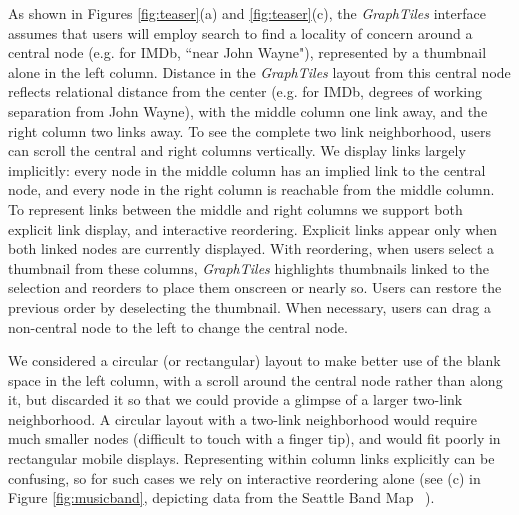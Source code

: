 As shown in Figures \ref{fig:teaser}(a) and \ref{fig:teaser}(c), the \textit{GraphTiles} interface assumes that users will employ search to find a locality of concern around a central node (e.g. for IMDb, ``near John Wayne"), represented by a thumbnail alone in the left column. Distance in the \textit{GraphTiles} layout from this central node reflects relational distance from the center (e.g. for IMDb, degrees of working separation from John Wayne), with the middle column one link away, and the right column two links away. To see the complete two link neighborhood, users can scroll the central and right columns vertically. We display links largely implicitly: every node in the middle column has an implied link to the central node, and every node in the right column is reachable from the middle column. To represent links between the middle and right columns we support both explicit link display, and interactive reordering. Explicit links appear only when both linked nodes are currently displayed. With reordering, when users select a thumbnail from these columns, \textit{GraphTiles} highlights thumbnails linked to the selection and reorders to place them onscreen or nearly so. Users can restore the previous order by deselecting the thumbnail. When necessary, users can drag a non-central node to the left to change the central node.

We considered a circular (or rectangular) layout to make better use of the blank space in the left column, with a scroll around the central node rather than along it, but discarded it so that we could provide a glimpse of a larger two-link neighborhood. A circular layout with a two-link neighborhood would require much smaller nodes (difficult to touch with a finger tip), and would fit poorly in rectangular mobile displays. Representing within column links explicitly can be confusing, so for such cases we rely on interactive reordering alone (see (c) in Figure \ref{fig:musicband}, depicting data from the Seattle Band Map ~\cite{seattleband}).
